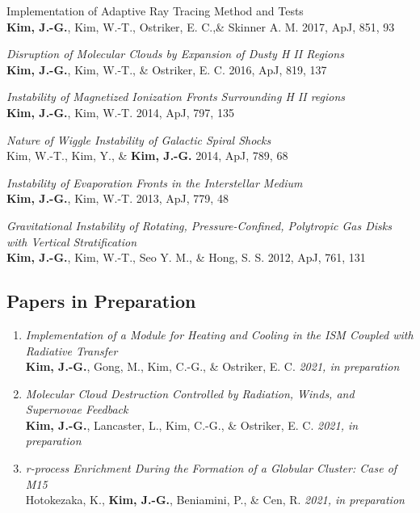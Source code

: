 \begin{benumerate}{14}
{Implementation of Adaptive Ray Tracing Method and Tests}\\ \textbf{Kim, J.-G.},
Kim, W.-T., Ostriker, E. C.,\& Skinner A. M. 2017, ApJ, 851, 93
\item \textit{Disruption of Molecular Clouds by Expansion of Dusty H II
Regions}\\ \textbf{Kim, J.-G.}, Kim, W.-T., \& Ostriker, E. C. 2016, ApJ, 819,
137
\item \textit{Instability of Magnetized Ionization Fronts Surrounding H II
regions}\\ \textbf{Kim, J.-G.}, Kim, W.-T. 2014, ApJ, 797, 135
\item \textit{Nature of Wiggle Instability of Galactic Spiral Shocks}\\ Kim,
W.-T., Kim, Y., \& \textbf{Kim, J.-G.} 2014, ApJ, 789, 68
\item \textit{Instability of Evaporation Fronts in the Interstellar Medium}\\
  \textbf{Kim, J.-G.}, Kim, W.-T. 2013, ApJ, 779, 48
\item \textit{Gravitational Instability of Rotating, Pressure-Confined,
    Polytropic Gas Disks with Vertical Stratification} \\ \textbf{Kim, J.-G.},
  Kim, W.-T., Seo Y. M., \& Hong, S. S. 2012, ApJ, 761, 131
\end{benumerate}

\subsection{Papers in Preparation}
\begin{enumerate}
\item[] \textit{Implementation of a Module for Heating and Cooling in the ISM
    Coupled with Radiative Transfer}\\ \textbf{Kim, J.-G.}, Gong, M., Kim,
  C.-G., \& Ostriker, E. C. \textit{2021, in preparation}
\item[] \textit{Molecular Cloud Destruction Controlled by Radiation, Winds, and
Supernovae Feedback} \\ \textbf{Kim, J.-G.}, Lancaster, L., Kim, C.-G., \&
Ostriker, E. C. \textit{2021, in preparation}
\item[] \textit{r-process Enrichment During the Formation of a Globular Cluster: Case
    of M15} \\
  Hotokezaka, K., \textbf{Kim, J.-G.}, Beniamini, P., \& Cen, R. \textit{2021,
    in preparation}

\end{enumerate}

